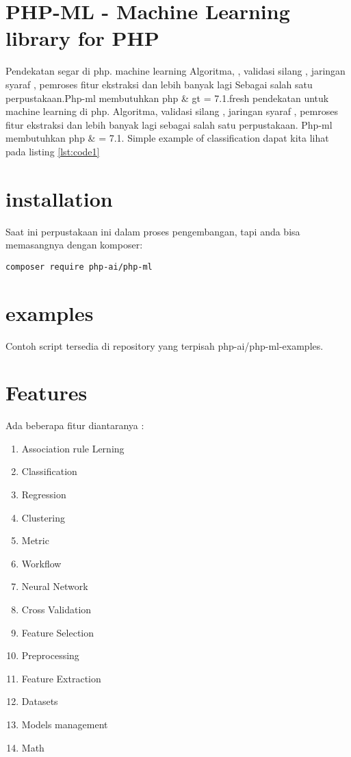 
\section{PHP-ML - Machine Learning library for PHP}
Pendekatan segar di php. machine learning Algoritma, , validasi silang , jaringan syaraf , pemroses fitur ekstraksi dan lebih banyak lagi Sebagai salah satu perpustakaan.Php-ml membutuhkan php \& gt\; = 7.1.fresh pendekatan untuk machine learning di php. Algoritma, validasi silang , jaringan syaraf , pemroses fitur ekstraksi dan lebih banyak lagi sebagai salah satu perpustakaan.
Php-ml membutuhkan php \& = 7.1.
Simple example of classification dapat kita lihat pada listing \ref{lst:code1}

\section{installation} 
Saat ini perpustakaan ini dalam proses pengembangan, tapi anda bisa memasangnya dengan komposer:

\begin{verbatim}composer require php-ai/php-ml\end{verbatim}

\section{examples}
Contoh script tersedia di repository yang terpisah php-ai/php-ml-examples.


\section{Features}
Ada beberapa fitur diantaranya :
\begin{enumerate}
\item Association rule Lerning
\item Classification
\item Regression
\item Clustering
\item Metric
\item Workflow
\item Neural Network
\item Cross Validation
\item Feature Selection
\item Preprocessing
\item Feature Extraction
\item Datasets
\item Models management
\item Math
\end{enumerate}

